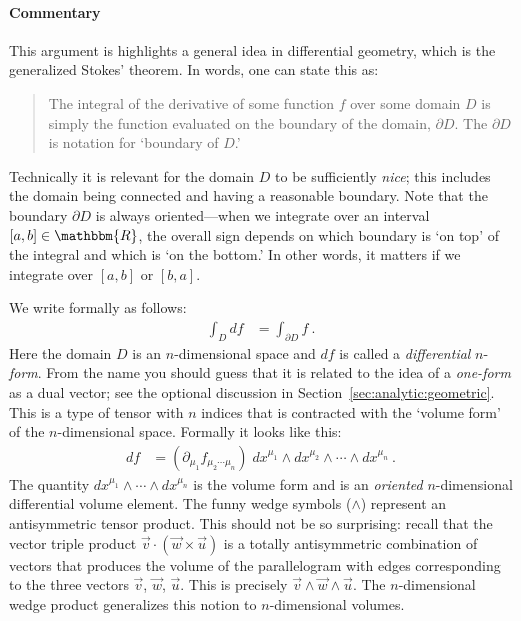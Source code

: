 \paragraph{Commentary}
This argument is highlights a general idea in differential geometry, which is the generalized Stokes' theorem. In words, one can state this as:
\begin{quote}
The integral of the derivative of some function $f$ over some domain $D$ is simply the function evaluated on the boundary of the domain, $\partial D$. The $\partial D$ is notation for `boundary of $D$.'
\end{quote}
Technically it is relevant for the domain $D$ to be sufficiently \emph{nice}; this includes the domain being connected and having a reasonable boundary. Note that the boundary $\partial D$ is always oriented---when we integrate over an interval $[a,b]\in \mathbbm{R}$, the overall sign depends on which boundary is `on top' of the integral and which is `on the bottom.' In other words, it matters if we integrate over $[a,b]$ or $[b,a]$. 

We write formally as follows:
\begin{align}
	\int_D df &= \int_{\partial D} f \ .
\end{align}
Here the domain $D$ is an $n$-dimensional space and $df$ is called a \emph{differential} $n$-\emph{form}. From the name you should guess that it is related to the idea of a \emph{one-form} as a dual vector; see the optional discussion in Section~\ref{sec:analytic:geometric}.  This is a type of tensor with $n$ indices that is contracted with the `volume form' of the $n$-dimensional space. Formally it looks like this:
\begin{align}
	df &= (\partial_{\mu_1} f_{\mu_2\cdots \mu_n}) \; dx^{\mu_1}\wedge dx^{\mu_2}\wedge\cdots\wedge dx^{\mu_n} \ .
	\label{eq:Stokes}
\end{align}
The quantity $dx^{\mu_1}\wedge\cdots\wedge dx^{\mu_n}$ is the volume form and is an \emph{oriented} $n$-dimensional differential volume element. The funny wedge symbols ($\wedge$) represent an antisymmetric tensor product. This should not be so surprising: recall that the vector triple product $\vec{v}\cdot\left(\vec{w}\times\vec{u}\right)$ is a totally antisymmetric combination of vectors that produces the volume of the parallelogram with edges corresponding to the three vectors $\vec{v}$, $\vec{w}$, $\vec{u}$. This is precisely $\vec{v}\wedge\vec{w}\wedge\vec{u}$. The $n$-dimensional wedge product generalizes this notion to $n$-dimensional volumes. 

